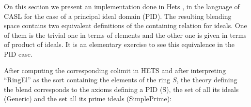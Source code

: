On this section we present an implementation done in
Hets \parencite{Mossakowskihets}, in the language of CASL for the case
of a principal ideal domain (PID).  The resulting blending space
contains two equivalent definitions of the containing relation for
ideals. One of them is the trivial one in terms of elements and the
other one is given in terms of product of ideals. It is an elementary
exercise to see this equivalence in the PID case.



After computing the corresponding colimit in HETS and after
interpreting ``RingEl'' as the sort containing the elements of the ring
$S$, the theory defining the blend corresponds to the axioms defining
a PID (S), the set of all its ideals (Generic) and the set all its
prime ideals (SimplePrime):






